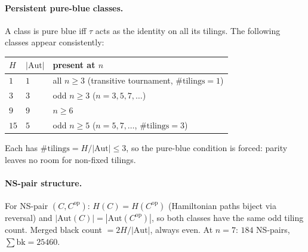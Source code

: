 \documentclass[12pt,reqno]{amsart}
\theoremstyle{definition}
\theoremstyle{plain}
\begin{document}
\paragraph{Persistent pure-blue classes.}
A class is pure blue iff $\tau$ acts as the identity on all its tilings.
The following classes appear consistently:
\begin{center}
\begin{tabular}{lll}
\hline
$H$ & $|\mathrm{Aut}|$ & present at $n$ \\
\hline
$1$ & $1$ & all $n\ge 3$ (transitive tournament, $\#\mathrm{tilings}=1$) \\
$3$ & $3$ & odd $n\ge 3$ ($n=3,5,7,\ldots$) \\
$9$ & $9$ & $n\ge 6$ \\
$15$ & $5$ & odd $n\ge 5$ ($n=5,7,\ldots$, $\#\mathrm{tilings}=3$) \\
\hline
\end{tabular}
\end{center}
Each has $\#\text{tilings}=H/|\mathrm{Aut}|\le 3$, so the pure-blue condition is
forced: parity leaves no room for non-fixed tilings.

\paragraph{NS-pair structure.}
For NS-pair $(C,C^{\mathrm{op}})$: $H(C)=H(C^{\mathrm{op}})$
(Hamiltonian paths biject via reversal) and $|\mathrm{Aut}(C)|=|\mathrm{Aut}(C^{\mathrm{op}})|$,
so both classes have the same odd tiling count.
Merged black count $=2H/|\mathrm{Aut}|$, always even.
At $n=7$: $184$ NS-pairs, $\sum\mathrm{bk}=25460$.
\end{document}
